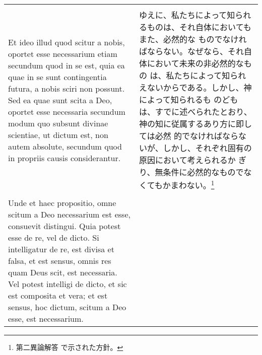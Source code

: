 \documentclass[10pt]{jsarticle} %
\begin{document}
\begin{longtable}{p{21em}p{21em}}
\\\\

Et ideo illud quod scitur a nobis, oportet esse necessarium etiam
secundum quod in se est, quia ea quae in se sunt contingentia futura,
a nobis sciri non possunt. Sed ea quae sunt scita a Deo, oportet esse
necessaria secundum modum quo subsunt divinae scientiae, ut dictum
est, non autem absolute, secundum quod in propriis causis
considerantur.


&

ゆえに、私たちによって知られるものは、それ自体においてもまた、必然的な
ものでなければならない。なぜなら、それ自体において未来の非必然的なもの
は、私たちによって知られえないからである。しかし、神によって知られるも
のどもは、すでに述べられたとおり、神の知に従属するあり方に即しては必然
的でなければならないが、しかし、それぞれ固有の原因において考えられるか
ぎり、無条件に必然的なものでなくてもかまわない。\footnote{第二異論解答
で示された方針。}

\\\\

Unde et haec propositio, omne scitum a Deo necessarium est esse,
consuevit distingui. Quia potest esse de re, vel de dicto. Si
intelligatur de re, est divisa et falsa, et est sensus, omnis res quam
Deus scit, est necessaria. Vel potest intelligi de dicto, et sic est
composita et vera; et est sensus, hoc dictum, scitum a Deo esse, est
necessarium.


&


\end{longtable}
\end{document}
